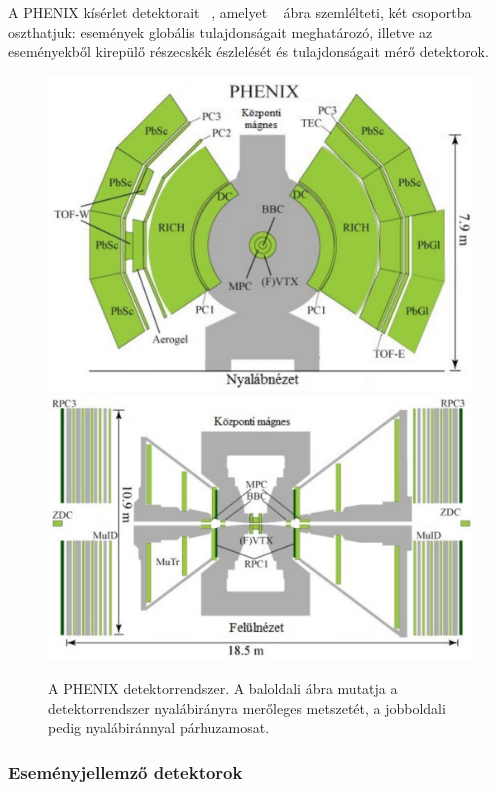\documentclass[11pt,a4paper]{article}
\numberwithin{equation}{subsection}
\numberwithin{figure}{section}
\begin{document}
A PHENIX kísérlet detektorait ~\cite{Adcox:2003zm}, amelyet ~ ábra szemlélteti, két csoportba oszthatjuk: események globális tulajdonságait meghatározó, illetve az eseményekből kirepülő részecskék észlelését és tulajdonságait mérő detektorok.

\begin{figure}[H]
\centering
\includegraphics[scale=0.32]{pic/int/phenix1}
\includegraphics[scale=0.32]{pic/int/phenix2}
\caption{A PHENIX detektorrendszer. A baloldali ábra mutatja a detektorrendszer nyalábirányra merőleges metszetét, a jobboldali pedig nyalábiránnyal párhuzamosat.}
\label{fig:phenix}
\end{figure}

\subsubsection{Eseményjellemző detektorok}\label{sec:phenix1}
\end{document}
